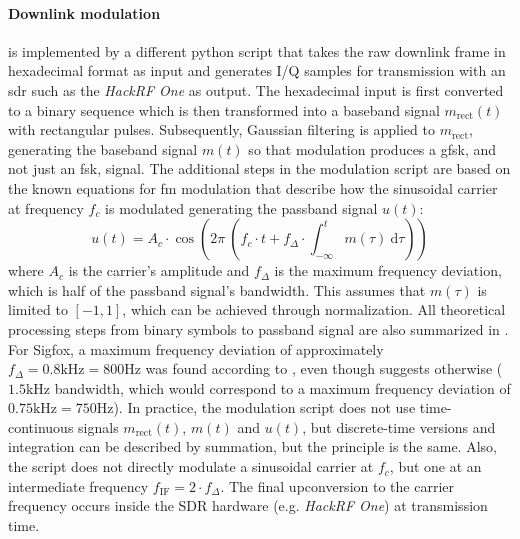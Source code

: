 \paragraph{Downlink modulation} is implemented by a different python script that takes the raw downlink frame in hexadecimal format as input and generates I/Q samples for transmission with an \gls{sdr} such as the \textit{HackRF One} as output.
The hexadecimal input is first converted to a binary sequence which is then transformed into a baseband signal $m_\text{rect}(t)$ with rectangular pulses.
Subsequently, Gaussian filtering is applied to $m_\text{rect}$, generating the baseband signal $m(t)$ so that modulation produces a \gls{gfsk}, and not just an \gls{fsk}, signal.
The additional steps in the modulation script are based on the known equations for \gls{fm} modulation \cite[Equation (4.3.13) and (4.3.14)]{commsys} that describe how the sinusoidal carrier at frequency $f_c$ is modulated generating the passband signal $u(t)$:
\begin{equation}
	u(t) = A_c \cdot \cos \left ( 2 \pi ~ \left ( f_c \cdot t + f_\Delta \cdot \int_{-\infty}^t m(\tau) ~ \mathrm d\tau \right) \right)
\end{equation}
where $A_c$ is the carrier's amplitude and $f_\Delta$ is the maximum frequency deviation, which is half of the passband signal's bandwidth.
This assumes that $m(\tau)$ is limited to $[-1, 1]$, which can be achieved through normalization.
All theoretical processing steps from binary symbols to passband signal are also summarized in .
For Sigfox, a maximum frequency deviation of approximately $f_\Delta = 0.8 \mathrm{kHz} = 800 \mathrm{Hz}$ was found according to , even though \cite[Section 5.2.1]{sigfox_ietf} suggests otherwise ($1.5 \mathrm{kHz}$ bandwidth, which would correspond to a maximum frequency deviation of $0.75 \mathrm{kHz} = 750 \mathrm{Hz}$).
In practice, the modulation script does not use time-continuous signals $m_\text{rect}(t)$, $m(t)$ and $u(t)$, but discrete-time versions and integration can be described by summation, but the principle is the same.
Also, the script does not directly modulate a sinusoidal carrier at $f_c$, but one at an intermediate frequency $f_\mathrm{IF} = 2 \cdot f_\Delta$.
The final upconversion to the carrier frequency occurs inside the SDR hardware (e.g. \textit{HackRF One}) at transmission time.

